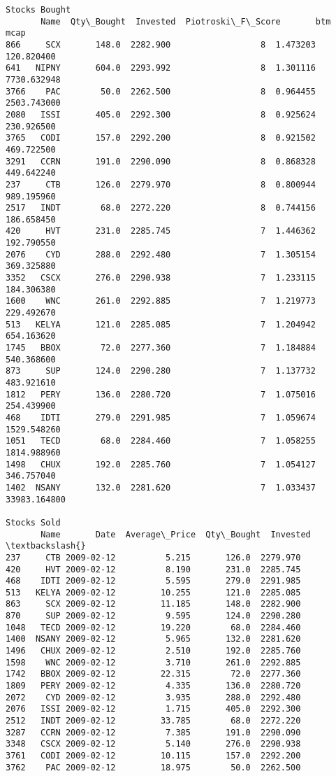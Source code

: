 \documentclass[11pt]{article}
\begin{document}
\begin{Verbatim}[commandchars=\\\{\}]
Stocks Bought
       Name  Qty\_Bought  Invested  Piotroski\_F\_Score       btm          mcap
866     SCX       148.0  2282.900                  8  1.473203    120.820400
641   NIPNY       604.0  2293.992                  8  1.301116   7730.632948
3766    PAC        50.0  2262.500                  8  0.964455   2503.743000
2080   ISSI       405.0  2292.300                  8  0.925624    230.926500
3765   CODI       157.0  2292.200                  8  0.921502    469.722500
3291   CCRN       191.0  2290.090                  8  0.868328    449.642240
237     CTB       126.0  2279.970                  8  0.800944    989.195960
2517   INDT        68.0  2272.220                  8  0.744156    186.658450
420     HVT       231.0  2285.745                  7  1.446362    192.790550
2076    CYD       288.0  2292.480                  7  1.305154    369.325880
3352   CSCX       276.0  2290.938                  7  1.233115    184.306380
1600    WNC       261.0  2292.885                  7  1.219773    229.492670
513   KELYA       121.0  2285.085                  7  1.204942    654.163620
1745   BBOX        72.0  2277.360                  7  1.184884    540.368600
873     SUP       124.0  2290.280                  7  1.137732    483.921610
1812   PERY       136.0  2280.720                  7  1.075016    254.439900
468    IDTI       279.0  2291.985                  7  1.059674   1529.548260
1051   TECD        68.0  2284.460                  7  1.058255   1814.988960
1498   CHUX       192.0  2285.760                  7  1.054127    346.757040
1402  NSANY       132.0  2281.620                  7  1.033437  33983.164800

Stocks Sold
       Name       Date  Average\_Price  Qty\_Bought  Invested  \textbackslash{}
237     CTB 2009-02-12          5.215       126.0  2279.970
420     HVT 2009-02-12          8.190       231.0  2285.745
468    IDTI 2009-02-12          5.595       279.0  2291.985
513   KELYA 2009-02-12         10.255       121.0  2285.085
863     SCX 2009-02-12         11.185       148.0  2282.900
870     SUP 2009-02-12          9.595       124.0  2290.280
1048   TECD 2009-02-12         19.220        68.0  2284.460
1400  NSANY 2009-02-12          5.965       132.0  2281.620
1496   CHUX 2009-02-12          2.510       192.0  2285.760
1598    WNC 2009-02-12          3.710       261.0  2292.885
1742   BBOX 2009-02-12         22.315        72.0  2277.360
1809   PERY 2009-02-12          4.335       136.0  2280.720
2072    CYD 2009-02-12          3.935       288.0  2292.480
2076   ISSI 2009-02-12          1.715       405.0  2292.300
2512   INDT 2009-02-12         33.785        68.0  2272.220
3287   CCRN 2009-02-12          7.385       191.0  2290.090
3348   CSCX 2009-02-12          5.140       276.0  2290.938
3761   CODI 2009-02-12         10.115       157.0  2292.200
3762    PAC 2009-02-12         18.975        50.0  2262.500


\end{Verbatim}
\end{document}
